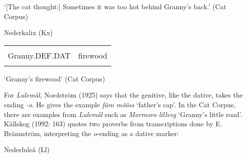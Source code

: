\begin{styleTranslation}
‘[The cat thought:] Sometimes it was too hot behind Granny’s back.’ (Cat Corpus)

\end{styleTranslation}

\begin{listWWNumileveli}
\item 

\begin{styleExample}
Nederkalix (Kx)

\end{styleExample}

\end{listWWNumileveli}

\begin{tabular}{ll}
\lsptoprule
\multicolumn{2}{l}{mårmorn

}\\
Granny.DEF.DAT & firewood\\
\lspbottomrule
\end{tabular}

\begin{styleTranslation}
‘Granny’s firewood’  (Cat Corpus)

\end{styleTranslation}

\begin{styleBodyTextFirst}
For \textit{Lulemål}, Nordström (1925) says that the genitive, like the dative, takes the ending\textit{ -o}. He gives the example \textit{färo mööss} ‘father’s cap’. In the Cat Corpus, there are examples from \textit{Lulemål} such as \textit{Mormoro lillveg} ‘Granny’s little road’.  Källskog (1992: 163) quotes two proverbs from transcriptions done by E. Brännström, interpreting the \textit{o}{}-ending as a dative marker: 

\end{styleBodyTextFirst}

\begin{listWWNumileveli}
\item 

\begin{styleExample}
Nederluleå (Ll)

\end{styleExample}

\end{listWWNumileveli}

\begin{listWWNumlxxiiileveli}
\item 

\end{listWWNumlxxiiileveli}

